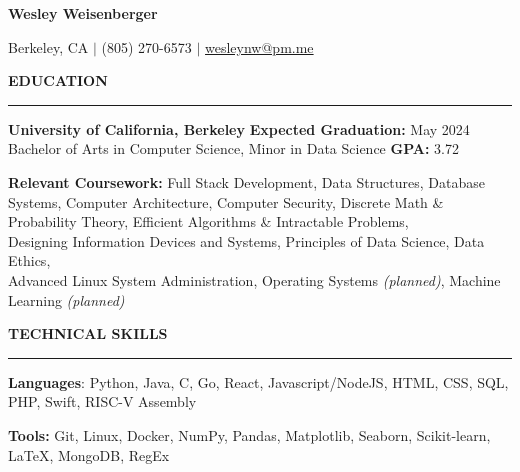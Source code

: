 \documentclass{article}
\begin{document}
\pagestyle{fancy}
\fancyhead{}\fancyfoot{}

\newcommand{\header}[1]{
    \vspace{4mm}
    {\large \noindent \textbf{#1}}
    \vspace{1.5mm}
    \hrule
    \vspace{2mm}
}

\begin{center}

    {\LARGE \textbf{Wesley Weisenberger}}

    \vspace{2mm}

    {\large Berkeley, CA  $\mid$ (805) 270-6573
        $\mid$
        \href{mailto:wesleynw@pm.me}{wesleynw@pm.me}

    }

\end{center}

\vspace{-2.5mm}

\header{EDUCATION}

\begin{adjustwidth}{1em}{1em}

    \textbf{University of California, Berkeley}
    \hfill
    \textbf{Expected Graduation:} May 2024 \\
    Bachelor of Arts in Computer Science, Minor in Data Science \hfill  \textbf{GPA:} 3.72

    \vspace{2.5mm}

    \textbf{Relevant Coursework:}
        Full Stack Development,
        Data Structures,
        Database Systems,
        Computer Architecture,
        Computer Security,
        Discrete Math \& Probability Theory,
        Efficient Algorithms \& Intractable Problems, \\
        Designing Information Devices and Systems,
        Principles of Data Science,
        Data Ethics, \\
        Advanced Linux System Administration,
        Operating Systems \textit{(planned)},
        Machine Learning \textit{(planned)}

\end{adjustwidth}

\header{TECHNICAL SKILLS}

\begin{adjustwidth}{1em}{1em}

    \textbf{Languages}: Python, Java, C, Go, React, Javascript/NodeJS, HTML, CSS, SQL, PHP, Swift, RISC-V Assembly

    \vspace{1mm}

    \textbf{Tools:} Git, Linux, Docker, NumPy, Pandas, Matplotlib, Seaborn, Scikit-learn, \LaTeX, MongoDB, RegEx

\end{adjustwidth}
\end{document}
